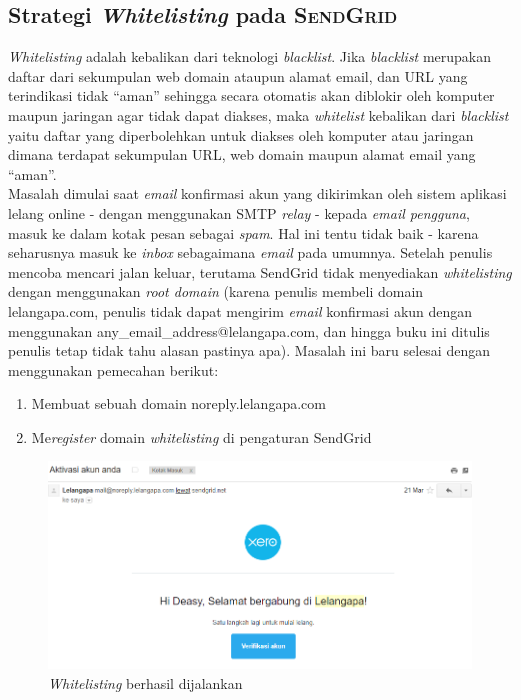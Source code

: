 \subsection{Strategi \textit{Whitelisting} pada \textsc{SendGrid}}
	\textit{Whitelisting} adalah kebalikan dari teknologi \textit{blacklist}. Jika \textit{blacklist} merupakan daftar dari sekumpulan web domain ataupun alamat email, dan URL yang terindikasi tidak “aman” sehingga secara otomatis akan diblokir oleh komputer maupun jaringan agar tidak dapat diakses, maka \textit{whitelist} kebalikan dari \textit{blacklist} yaitu daftar yang diperbolehkan untuk diakses oleh komputer atau jaringan dimana terdapat sekumpulan URL, web domain maupun alamat email yang “aman”.\\
	\indent Masalah dimulai saat \textit{email} konfirmasi akun yang dikirimkan oleh sistem aplikasi lelang online - dengan menggunakan SMTP \textit{relay} - kepada \textit{email pengguna}, masuk ke dalam kotak pesan sebagai \textit{spam}. Hal ini tentu tidak baik - karena seharusnya masuk ke \textit{inbox} sebagaimana \textit{email} pada umumnya. Setelah penulis mencoba mencari jalan keluar, terutama SendGrid tidak menyediakan \textit{whitelisting} dengan menggunakan \textit{root domain} (karena penulis membeli domain lelangapa.com, penulis tidak dapat mengirim \textit{email} konfirmasi akun dengan menggunakan any\_email\_address@lelangapa.com, dan hingga buku ini ditulis penulis tetap tidak tahu alasan pastinya apa). Masalah ini baru selesai dengan menggunakan pemecahan berikut:
	\begin{enumerate}
		\item Membuat sebuah domain noreply.lelangapa.com
		\item Me\textit{register} domain \textit{whitelisting} di pengaturan SendGrid
	\end{enumerate}
	
	\begin{figure}[H]
		\centering
		\includegraphics[width=\textwidth]{images/bab4/pl/whitelist-success.png}
		\caption{\textit{Whitelisting} berhasil dijalankan}
		\label{whitelist-success}
	\end{figure}
	

